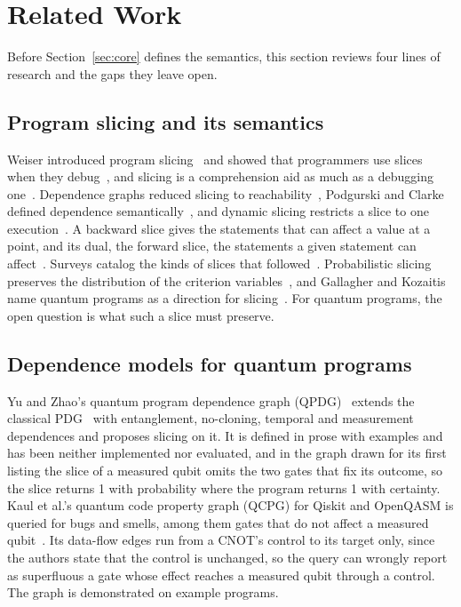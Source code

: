 \section{Related Work}\label{sec:related}

Before Section~\ref{sec:core} defines the semantics, this section reviews four lines of research and the gaps they
leave open.

\subsection{Program slicing and its semantics}
Weiser introduced program slicing~\cite{weiser1984program} and showed that programmers use slices when they
debug~\cite{weiser1982programmers}, and slicing is a comprehension aid as much as a debugging
one~\cite{gallagher1991using}. Dependence graphs reduced slicing to reachability~\cite{ottenstein1984pdg,
ferrante1987pdg, horwitz1990interprocedural}, Podgurski and Clarke defined dependence
semantically~\cite{podgurski1990formal}, and dynamic slicing restricts a slice to one execution~\cite{korel1988dynamic,
agrawal1990dynamic}. A backward slice gives the statements that can affect a value at a point, and its dual, the
forward slice, the statements a given statement can affect~\cite{tip1994a, horwitz1990interprocedural}. Surveys catalog the kinds of slices that followed~\cite{tip1994a, silva2012vocabulary, binkley2004a}.
Probabilistic slicing preserves the distribution of the criterion variables~\cite{hur2014slicing, amtoft2020theory,
olmedo2025slicing}, and Gallagher and Kozaitis name quantum programs as a direction for
slicing~\cite{gallagher2025program}. For quantum programs, the open question is what such a slice must preserve.

\subsection{Dependence models for quantum programs}
Yu and Zhao's quantum program dependence graph (QPDG)~\cite{yu2025qpdg} extends the classical
PDG~\cite{ferrante1987pdg} with entanglement, no-cloning, temporal and measurement dependences and proposes slicing on
it. It is defined in prose with examples and has been neither implemented nor evaluated, and in the graph drawn for
its first listing the slice of a measured qubit omits the two gates that fix its outcome, so the slice returns 1 with
probability \numYzFigSliceProb{} where the program returns 1 with certainty. Kaul et al.'s quantum code property graph
(QCPG) for Qiskit and OpenQASM is queried for bugs and smells, among them gates that do not affect a measured
qubit~\cite{kaul2023uniform}. Its data-flow edges run from a CNOT's control to its target only, since the authors
state that the control is unchanged, so the query can wrongly report as superfluous a gate whose effect reaches a measured qubit through
a control. The graph is demonstrated on example programs.

